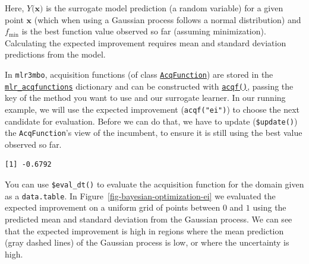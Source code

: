 Here, \(Y(\mathbf{x)}\) is the surrogate model prediction (a random
variable) for a given point \(\mathbf{x}\) (which when using a Gaussian
process follows a normal distribution) and \(f_{\mathrm{min}}\) is the
best function value observed so far (assuming minimization). Calculating
the expected improvement requires mean and standard deviation
predictions from the model.

In \texttt{mlr3mbo}, acquisition functions (of class
\href{https://mlr3mbo.mlr-org.com/reference/AcqFunction.html}{\texttt{AcqFunction}})
are stored in the
\href{https://mlr3mbo.mlr-org.com/reference/mlr_acqfunctions.html}{\texttt{mlr\_acqfunctions}}
dictionary and can be constructed with
\href{https://mlr3mbo.mlr-org.com/reference/acqf.html}{\texttt{acqf()}},
passing the key of the method you want to use and our surrogate learner.
In our running example, we will use the expected improvement
(\texttt{acqf("ei")}) to choose the next candidate for evaluation.
Before we can do that, we have to update (\texttt{\$update()}) the
\texttt{AcqFunction}'s view of the incumbent, to ensure it is still
using the best value observed so far.

\begin{Shaded}
\begin{Highlighting}[]
\OtherTok{=} \NormalTok{(}\NormalTok{, }
\SpecialCharTok{$}\NormalTok{()}
\SpecialCharTok{$}
\end{Highlighting}
\end{Shaded}

\begin{verbatim}
[1] -0.6792
\end{verbatim}

You can use \texttt{\$eval\_dt()} to evaluate the acquisition function
for the domain given as a \texttt{data.table}. In
Figure~\ref{fig-bayesian-optimization-ei} we evaluated the expected
improvement on a uniform grid of points between \(0\) and \(1\) using
the predicted mean and standard deviation from the Gaussian process. We
can see that the expected improvement is high in regions where the mean
prediction (gray dashed lines) of the Gaussian process is low, or where
the uncertainty is high.


